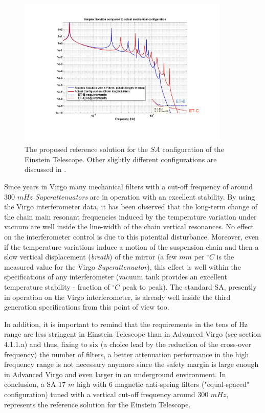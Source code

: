\begin{figure}[t]
	\begin{center}
		\includegraphics[width=0.9\textwidth]{./Sec_Suspensions/Figures/Par4-Fig4.pdf}
			\caption{The proposed reference solution for the $SA$ configuration of the Einstein Telescope. Other slightly different configurations are discussed in \cite{Braccini2010March1-3}.}
\label{Par4Fig4}
	\end{center}
\end{figure}
%
Since years in Virgo many mechanical filters with a cut-off frequency of around $300$ $mHz$ \emph{Superattenuators} are  in operation  with an excellent stability. By using the Virgo interferometer data, it has been observed that the long-term change of the chain main resonant frequencies induced by the temperature variation under vacuum are 
well inside the line-width of the chain vertical resonances. No effect on the interferometer control is due to this potential disturbance. Moreover, even if the temperature variations induce a motion of the suspension chain and then a slow vertical displacement ({\it {breath}}) of the mirror (a few $mm$ per $^{\circ}C$ is the measured 
value for the Virgo \emph{Superattenuator}), this effect is well within the specifications of any interferometer (vacuum tank provides an excellent temperature stability - fraction of $^{\circ}C$ peak to peak).
The standard SA, presently in operation on the Virgo interferometer, is already well inside the third generation specifications from this point of view too.

In addition, it is important to remind that the requirements in the tens of Hz range are less stringent in Einstein Telescope than in Advanced Virgo (see section 4.1.1.a) and thus, fixing to six (a choice lead by the reduction of the cross-over frequency) the number of filters, a better attenuation performance in the high frequency range is not necessary anymore since the safety margin is large enough in Advanced Virgo and even larger in an underground environment. In conclusion, a SA $17$ $m$ high with 6 magnetic anti-spring filters ("equal-spaced" configuration) tuned with a vertical cut-off frequency around 300 $mHz$, represents the reference solution for the Einstein Telescope. 

